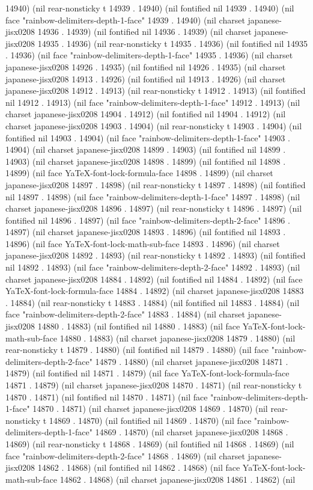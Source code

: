 14940) (nil rear-nonsticky t 14939 . 14940) (nil fontified nil 14939 . 14940) (nil face "rainbow-delimiters-depth-1-face" 14939 . 14940) (nil charset japanese-jisx0208 14936 . 14939) (nil fontified nil 14936 . 14939) (nil charset japanese-jisx0208 14935 . 14936) (nil rear-nonsticky t 14935 . 14936) (nil fontified nil 14935 . 14936) (nil face "rainbow-delimiters-depth-1-face" 14935 . 14936) (nil charset japanese-jisx0208 14926 . 14935) (nil fontified nil 14926 . 14935) (nil charset japanese-jisx0208 14913 . 14926) (nil fontified nil 14913 . 14926) (nil charset japanese-jisx0208 14912 . 14913) (nil rear-nonsticky t 14912 . 14913) (nil fontified nil 14912 . 14913) (nil face "rainbow-delimiters-depth-1-face" 14912 . 14913) (nil charset japanese-jisx0208 14904 . 14912) (nil fontified nil 14904 . 14912) (nil charset japanese-jisx0208 14903 . 14904) (nil rear-nonsticky t 14903 . 14904) (nil fontified nil 14903 . 14904) (nil face "rainbow-delimiters-depth-1-face" 14903 . 14904) (nil charset japanese-jisx0208 14899 . 14903) (nil fontified nil 14899 . 14903) (nil charset japanese-jisx0208 14898 . 14899) (nil fontified nil 14898 . 14899) (nil face YaTeX-font-lock-formula-face 14898 . 14899) (nil charset japanese-jisx0208 14897 . 14898) (nil rear-nonsticky t 14897 . 14898) (nil fontified nil 14897 . 14898) (nil face "rainbow-delimiters-depth-1-face" 14897 . 14898) (nil charset japanese-jisx0208 14896 . 14897) (nil rear-nonsticky t 14896 . 14897) (nil fontified nil 14896 . 14897) (nil face "rainbow-delimiters-depth-2-face" 14896 . 14897) (nil charset japanese-jisx0208 14893 . 14896) (nil fontified nil 14893 . 14896) (nil face YaTeX-font-lock-math-sub-face 14893 . 14896) (nil charset japanese-jisx0208 14892 . 14893) (nil rear-nonsticky t 14892 . 14893) (nil fontified nil 14892 . 14893) (nil face "rainbow-delimiters-depth-2-face" 14892 . 14893) (nil charset japanese-jisx0208 14884 . 14892) (nil fontified nil 14884 . 14892) (nil face YaTeX-font-lock-formula-face 14884 . 14892) (nil charset japanese-jisx0208 14883 . 14884) (nil rear-nonsticky t 14883 . 14884) (nil fontified nil 14883 . 14884) (nil face "rainbow-delimiters-depth-2-face" 14883 . 14884) (nil charset japanese-jisx0208 14880 . 14883) (nil fontified nil 14880 . 14883) (nil face YaTeX-font-lock-math-sub-face 14880 . 14883) (nil charset japanese-jisx0208 14879 . 14880) (nil rear-nonsticky t 14879 . 14880) (nil fontified nil 14879 . 14880) (nil face "rainbow-delimiters-depth-2-face" 14879 . 14880) (nil charset japanese-jisx0208 14871 . 14879) (nil fontified nil 14871 . 14879) (nil face YaTeX-font-lock-formula-face 14871 . 14879) (nil charset japanese-jisx0208 14870 . 14871) (nil rear-nonsticky t 14870 . 14871) (nil fontified nil 14870 . 14871) (nil face "rainbow-delimiters-depth-1-face" 14870 . 14871) (nil charset japanese-jisx0208 14869 . 14870) (nil rear-nonsticky t 14869 . 14870) (nil fontified nil 14869 . 14870) (nil face "rainbow-delimiters-depth-1-face" 14869 . 14870) (nil charset japanese-jisx0208 14868 . 14869) (nil rear-nonsticky t 14868 . 14869) (nil fontified nil 14868 . 14869) (nil face "rainbow-delimiters-depth-2-face" 14868 . 14869) (nil charset japanese-jisx0208 14862 . 14868) (nil fontified nil 14862 . 14868) (nil face YaTeX-font-lock-math-sub-face 14862 . 14868) (nil charset japanese-jisx0208 14861 . 14862) (nil 